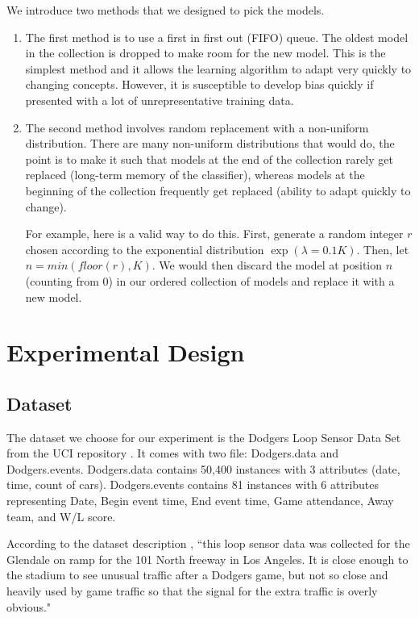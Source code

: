 \documentclass[conference]{IEEEtran}
\begin{document}
		We introduce two methods that we designed to pick the models.
		
		\begin{enumerate}
			\item The first method is to use a first in first out (FIFO) queue. The oldest model in the collection is dropped to make room for the new model. This is the simplest method and it allows the learning algorithm to adapt very quickly to changing concepts. However, it is susceptible to develop bias quickly if presented with a lot of unrepresentative training data.
			\item The second method involves random replacement with a non-uniform distribution. There are many non-uniform distributions that would do, the point is to make it such that models at the end of the collection rarely get replaced (long-term memory of the classifier), whereas models at the beginning of the collection frequently get replaced (ability to adapt quickly to change).
			
			For example, here is a valid way to do this. First, generate a random integer $r$ chosen according to the exponential distribution $\exp(\lambda = 0.1 K)$. Then, let $n = min(floor(r), K)$. We would then discard the model at position $n$ (counting from 0) in our ordered collection of models and replace it with a new model.
		\end{enumerate}
		
		
		
		
		\section{Experimental Design}
		\label{sec:experimental-design}
		\subsection{Dataset}
		The dataset we choose for our experiment is the Dodgers Loop Sensor Data Set from the UCI repository \cite{dataset}. It comes with two file: Dodgers.data and Dodgers.events. Dodgers.data contains 50,400 instances with 3 attributes (date, time, count of cars). Dodgers.events contains 81 instances with 6 attributes representing  Date, Begin event time, End event time, Game attendance, Away team, and W/L score. 
		
		According to the dataset description \cite{dataset}, ``this loop sensor data was collected for the Glendale on ramp for the 101 North freeway in Los Angeles. It is close enough to the stadium to see unusual traffic after a Dodgers game, but not so close and heavily used by game traffic so that the signal for the extra traffic is overly obvious." 
		
\end{document}

